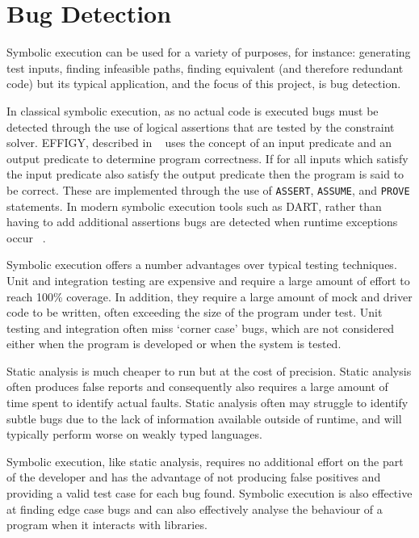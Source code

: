 \documentclass[]{final_report}
\begin{document}
\section{Bug Detection}

Symbolic execution can be used for a variety of purposes, for instance: generating test inputs, finding infeasible paths,  finding equivalent (and therefore redundant code) but its typical application, and the focus of this project, is bug detection. 

In classical symbolic execution, as no actual code is executed bugs must be detected through the use of logical assertions that are tested by the constraint solver.  EFFIGY, described in ~\cite{king1976symbolic} uses the concept of an input predicate and an output predicate to determine program correctness. If for all inputs which satisfy the input predicate also satisfy the output predicate then the program is said to be correct. These are implemented through the use of \lstinline{ASSERT}, \lstinline{ASSUME}, and \lstinline{PROVE} statements.  In modern symbolic execution tools such as DART, rather than having to add additional assertions bugs are detected when runtime exceptions occur ~\cite{godefroid2005dart}.

Symbolic execution offers a number advantages over typical testing techniques. Unit and integration testing are expensive and require a large amount of effort to reach 100\% coverage. In addition, they require a large amount of mock and driver code to be written, often exceeding the size of the program under test. Unit testing and integration often miss `corner case' bugs, which are not considered either when the program is developed or when the system is tested.

Static analysis is much cheaper to run but at the cost of precision. Static analysis often produces false reports and consequently also requires a large amount of time spent to identify actual faults. Static analysis often may struggle to identify subtle bugs due to the lack of information available outside of runtime, and will typically perform worse on weakly typed languages.

Symbolic execution, like static analysis, requires no additional effort on the part of the developer and has the advantage of not producing false positives and providing a valid test case for each bug found. Symbolic execution is also effective at finding edge case bugs and can also effectively analyse the behaviour of a program when it interacts with libraries.
\end{document}
